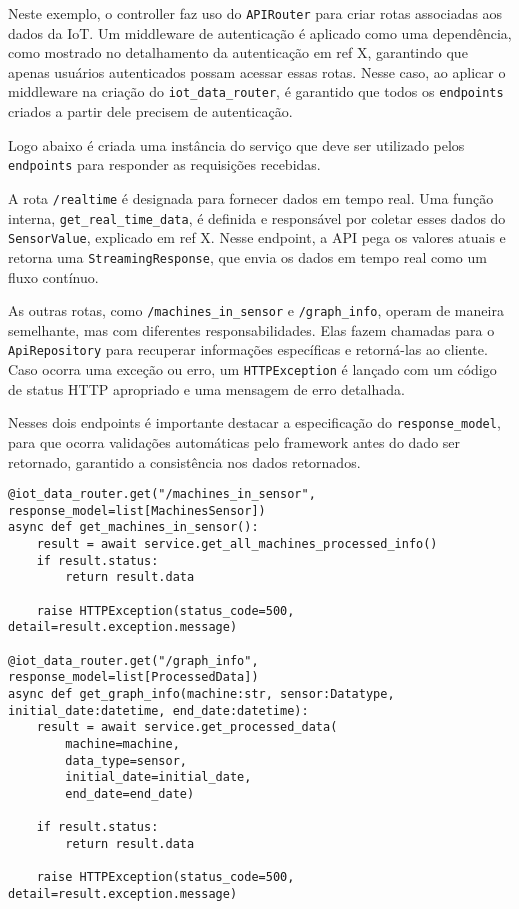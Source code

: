 Neste exemplo, o controller faz uso do \texttt{APIRouter} para criar rotas associadas aos dados da IoT. Um middleware de autenticação é aplicado como uma dependência, como mostrado no detalhamento da autenticação em ref X, garantindo que apenas usuários autenticados possam acessar essas rotas. Nesse caso, ao aplicar o middleware na criação do \texttt{iot\_data\_router}, é garantido que todos os \texttt{endpoints} criados a partir dele precisem de autenticação.

Logo abaixo é criada uma instância do serviço que deve ser utilizado pelos \texttt{endpoints} para responder as requisições recebidas.

A rota \texttt{/realtime} é designada para fornecer dados em tempo real. Uma função interna, \texttt{get\_real\_time\_data}, é definida e responsável por coletar esses dados do \texttt{SensorValue}, explicado em ref X. Nesse endpoint, a API pega os valores atuais e retorna uma \texttt{StreamingResponse}, que envia os dados em tempo real como um fluxo contínuo.

As outras rotas, como \texttt{/machines\_in\_sensor} e \texttt{/graph\_info}, operam de maneira semelhante, mas com diferentes responsabilidades. Elas fazem chamadas para o \texttt{ApiRepository} para recuperar informações específicas e retorná-las ao cliente. Caso ocorra uma exceção ou erro, um \texttt{HTTPException} é lançado com um código de status HTTP apropriado e uma mensagem de erro detalhada.

Nesses dois endpoints é importante destacar a especificação do \texttt{response\_model}, para que ocorra validações automáticas pelo framework antes do dado ser retornado, garantido a consistência nos dados retornados.

\begin{verbatim}
@iot_data_router.get("/machines_in_sensor", response_model=list[MachinesSensor])
async def get_machines_in_sensor():
    result = await service.get_all_machines_processed_info()
    if result.status:
        return result.data
    
    raise HTTPException(status_code=500, detail=result.exception.message)

@iot_data_router.get("/graph_info", response_model=list[ProcessedData])
async def get_graph_info(machine:str, sensor:Datatype, initial_date:datetime, end_date:datetime):
    result = await service.get_processed_data(
        machine=machine,
        data_type=sensor,
        initial_date=initial_date,
        end_date=end_date)
    
    if result.status:
        return result.data
    
    raise HTTPException(status_code=500, detail=result.exception.message)
\end{verbatim}

